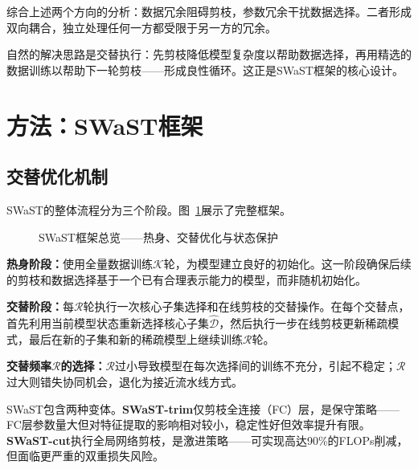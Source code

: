 综合上述两个方向的分析：数据冗余阻碍剪枝，参数冗余干扰数据选择。二者形成双向耦合，独立处理任何一方都受限于另一方的冗余。

自然的解决思路是交替执行：先剪枝降低模型复杂度以帮助数据选择，再用精选的数据训练以帮助下一轮剪枝——形成良性循环。这正是SWaST框架的核心设计。


\section{方法：SWaST框架}

\subsection{交替优化机制}

SWaST的整体流程分为三个阶段。图~\ref{fig:swast-framework}展示了完整框架。

\begin{figure}[htb]
  \centering
  \caption{SWaST框架总览——热身、交替优化与状态保护}
  \label{fig:swast-framework}
\end{figure}

\textbf{热身阶段：}使用全量数据训练$\mathcal{K}$轮，为模型建立良好的初始化。这一阶段确保后续的剪枝和数据选择基于一个已有合理表示能力的模型，而非随机初始化。

\textbf{交替阶段：}每$\mathcal{R}$轮执行一次核心子集选择和在线剪枝的交替操作。在每个交替点，首先利用当前模型状态重新选择核心子集$\hat{\mathcal{D}}$，然后执行一步在线剪枝更新稀疏模式，最后在新的子集和新的稀疏模型上继续训练$\mathcal{R}$轮。

\textbf{交替频率$\mathcal{R}$的选择：}$\mathcal{R}$过小导致模型在每次选择间的训练不充分，引起不稳定；$\mathcal{R}$过大则错失协同机会，退化为接近流水线方式。%

SWaST包含两种变体。\textbf{SWaST-trim}仅剪枝全连接（FC）层，是保守策略——FC层参数量大但对特征提取的影响相对较小，稳定性好但效率提升有限。\textbf{SWaST-cut}执行全局网络剪枝，是激进策略——可实现高达90\%的FLOPs削减，但面临更严重的双重损失风险。

